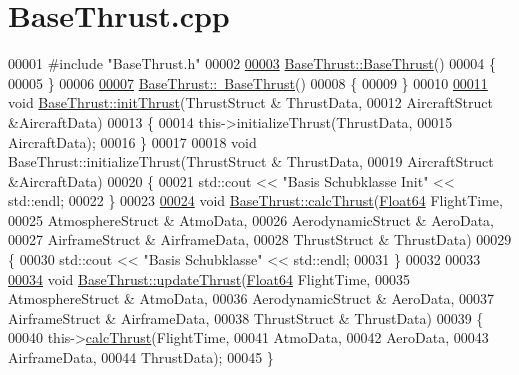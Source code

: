 \hypertarget{_base_thrust_8cpp_source}{}\section{Base\+Thrust.\+cpp}
\label{_base_thrust_8cpp_source}

\begin{DoxyCode}
00001 \textcolor{preprocessor}{#include "BaseThrust.h"}
00002 
\hyperlink{group___engine_a19885a6a70bfc4c02e2d8f310af9f22e}{00003} \hyperlink{group___engine_a19885a6a70bfc4c02e2d8f310af9f22e}{BaseThrust::BaseThrust}()
00004 \{
00005 \}
00006 
\hyperlink{group___engine_a554955351c2acfe7a46c00fe056c5c6c}{00007} \hyperlink{group___engine_a554955351c2acfe7a46c00fe056c5c6c}{BaseThrust::~BaseThrust}()
00008 \{
00009 \}
00010 
\hyperlink{group___engine_a02b3fe7f763d84c5d34b59f124eaf455}{00011} \textcolor{keywordtype}{void} \hyperlink{group___engine_a02b3fe7f763d84c5d34b59f124eaf455}{BaseThrust::initThrust}(ThrustStruct & ThrustData,
00012                             AircraftStruct &AircraftData)
00013 \{
00014     this->initializeThrust(ThrustData, 
00015                            AircraftData);
00016 \}
00017 
00018 \textcolor{keywordtype}{void} BaseThrust::initializeThrust(ThrustStruct & ThrustData,
00019                                   AircraftStruct &AircraftData)
00020 \{
00021     std::cout << \textcolor{stringliteral}{"Basis Schubklasse Init"} << std::endl;
00022 \}
00023 
\hyperlink{group___engine_ac578e683598739655ce52ea85d97362b}{00024} \textcolor{keywordtype}{void} \hyperlink{group___engine_ac578e683598739655ce52ea85d97362b}{BaseThrust::calcThrust}(\hyperlink{group___tools_ga3f1431cb9f76da10f59246d1d743dc2c}{Float64} FlightTime,
00025                             AtmosphereStruct & AtmoData,
00026                             AerodynamicStruct & AeroData,
00027                             AirframeStruct & AirframeData,
00028                             ThrustStruct & ThrustData)
00029 \{
00030     std::cout << \textcolor{stringliteral}{"Basis Schubklasse"} << std::endl;
00031 \}
00032 
00033 
\hyperlink{group___engine_a869359a1b2b7cddcbe5979d6a1cf5eac}{00034} \textcolor{keywordtype}{void} \hyperlink{group___engine_a869359a1b2b7cddcbe5979d6a1cf5eac}{BaseThrust::updateThrust}(\hyperlink{group___tools_ga3f1431cb9f76da10f59246d1d743dc2c}{Float64} FlightTime,
00035                             AtmosphereStruct & AtmoData,
00036                             AerodynamicStruct & AeroData,
00037                             AirframeStruct & AirframeData,
00038                             ThrustStruct & ThrustData)
00039 \{
00040     this->\hyperlink{group___engine_ac578e683598739655ce52ea85d97362b}{calcThrust}(FlightTime,
00041                     AtmoData,
00042                     AeroData,
00043                     AirframeData,
00044                     ThrustData);
00045 \}
\end{DoxyCode}
